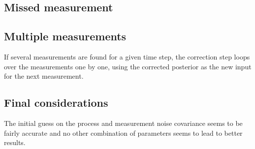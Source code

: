\documentclass{article}
\begin{document}
\subsection{Missed measurement}

\subsection{Multiple measurements}
If several measurements are found for a given time step, the correction step loops over the measurements one by one, using the corrected posterior as the new input for the next measurement.

\subsection{Final considerations}

The initial guess on the process and measurement noise covariance seems to be fairly accurate and no other combination of parameters seems to lead to better results. 





% 
% 
\end{document}
